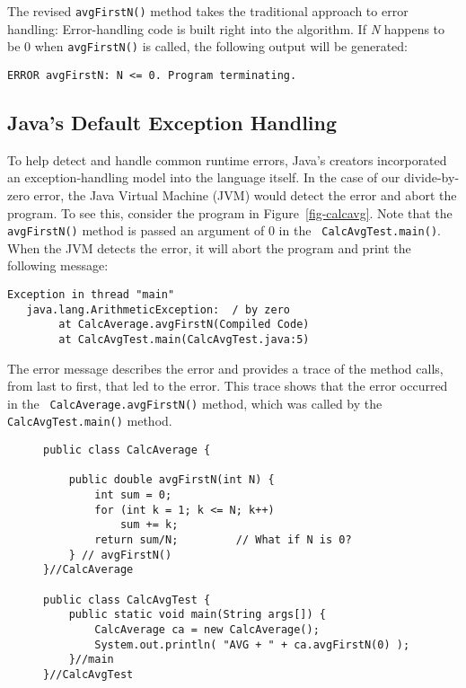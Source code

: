 \noindent The revised {\tt avgFirstN()} method takes the traditional 
approach to error handling: Error-handling code is built right into
the algorithm.  If {\it N} happens to be 0 when {\tt avgFirstN()} is
called, the following output will be generated:

\begin{jjjlisting}
\begin{lstlisting}
ERROR avgFirstN: N <= 0. Program terminating.
\end{lstlisting}
\end{jjjlisting}

\subsection{Java's Default Exception Handling}
\noindent To help detect and handle common runtime errors, Java's creators
incorporated an exception-handling model into the language
itself. In the case of our divide-by-zero error, the Java Virtual
Machine (JVM) would detect the error and abort the program. To
see this, consider the program in Figure~\ref{fig-calcavg}. Note that
the {\tt avgFirstN()} method is passed an argument of 0 in the {\tt
CalcAvgTest.main()}.  When the JVM detects the error, it will abort
the program and print the following message:

\begin{jjjlisting}
\begin{lstlisting}
Exception in thread "main" 
   java.lang.ArithmeticException:  / by zero
        at CalcAverage.avgFirstN(Compiled Code)
        at CalcAvgTest.main(CalcAvgTest.java:5)
\end{lstlisting}
\end{jjjlisting}

\noindent The error message describes the error and
provides a trace of the method calls, from last to first, that led to
the error.  This trace shows that the error occurred in the {\tt
CalcAverage.avgFirstN()} method, which was called by the {\tt
CalcAvgTest.main()} method.

\begin{figure}[tb]
\jjjprogstart
\begin{jjjlisting}
\begin{lstlisting}
public class CalcAverage {

    public double avgFirstN(int N) {
        int sum = 0;
        for (int k = 1; k <= N; k++)
            sum += k;
        return sum/N;         // What if N is 0?
    } // avgFirstN()
}//CalcAverage

public class CalcAvgTest {
    public static void main(String args[]) {
        CalcAverage ca = new CalcAverage();
        System.out.println( "AVG + " + ca.avgFirstN(0) );        
    }//main
}//CalcAvgTest
\end{lstlisting}
\end{jjjlisting}
\end{figure}

